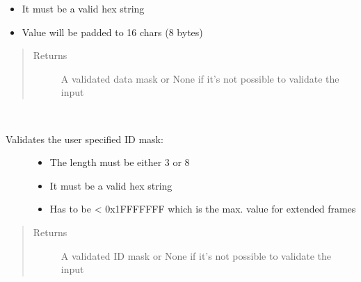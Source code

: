 \documentclass[letterpaper,10pt,english]{sphinxmanual}
\begin{document}
\begin{fulllineitems}
\begin{fulllineitems}
\begin{description}
\begin{itemize}
\item {} 
It must be a valid hex string

\item {} 
Value will be padded to 16 chars (8 bytes)

\end{itemize}

\end{description}
\begin{quote}\begin{description}
\item[{Returns}] \leavevmode
A validated data mask or None if it’s not possible to validate the input

\end{description}\end{quote}

\end{fulllineitems}


\begin{fulllineitems}
\label{\detokenize{src:src.FuzzerTab.FuzzerTab.validateIDMaskInput}}~\begin{description}
\item[{Validates the user specified ID mask:}] \leavevmode\begin{itemize}
\item {} 
The length must be either 3 or 8

\item {} 
It must be a valid hex string

\item {} 
Has to be \textless{} 0x1FFFFFFF which is the max. value for extended frames

\end{itemize}

\end{description}
\begin{quote}\begin{description}
\item[{Returns}] \leavevmode
A validated ID mask or None if it’s not possible to validate the input

\end{description}\end{quote}

\end{fulllineitems}


\end{fulllineitems}
\end{document}

